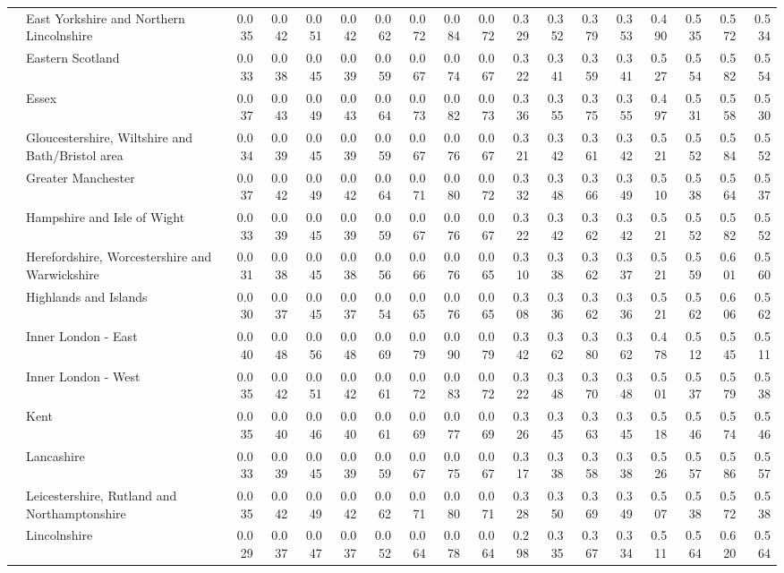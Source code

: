 \begin{tabular}{llrrrrrrrrrrrrrrrr}
 & East Yorkshire and Northern Lincolnshire & 0.035 & 0.042 & 0.051 & 0.042 & 0.062 & 0.072 & 0.084 & 0.072 & 0.329 & 0.352 & 0.379 & 0.353 & 0.490 & 0.535 & 0.572 & 0.534 \\
 & Eastern Scotland & 0.033 & 0.038 & 0.045 & 0.039 & 0.059 & 0.067 & 0.074 & 0.067 & 0.322 & 0.341 & 0.359 & 0.341 & 0.527 & 0.554 & 0.582 & 0.554 \\
 & Essex & 0.037 & 0.043 & 0.049 & 0.043 & 0.064 & 0.073 & 0.082 & 0.073 & 0.336 & 0.355 & 0.375 & 0.355 & 0.497 & 0.531 & 0.558 & 0.530 \\
 & Gloucestershire, Wiltshire and Bath/Bristol area & 0.034 & 0.039 & 0.045 & 0.039 & 0.059 & 0.067 & 0.076 & 0.067 & 0.321 & 0.342 & 0.361 & 0.342 & 0.521 & 0.552 & 0.584 & 0.552 \\
 & Greater Manchester & 0.037 & 0.042 & 0.049 & 0.042 & 0.064 & 0.071 & 0.080 & 0.072 & 0.332 & 0.348 & 0.366 & 0.349 & 0.510 & 0.538 & 0.564 & 0.537 \\
 & Hampshire and Isle of Wight & 0.033 & 0.039 & 0.045 & 0.039 & 0.059 & 0.067 & 0.076 & 0.067 & 0.322 & 0.342 & 0.362 & 0.342 & 0.521 & 0.552 & 0.582 & 0.552 \\
 & Herefordshire, Worcestershire and Warwickshire & 0.031 & 0.038 & 0.045 & 0.038 & 0.056 & 0.066 & 0.076 & 0.065 & 0.310 & 0.338 & 0.362 & 0.337 & 0.521 & 0.559 & 0.601 & 0.560 \\
 & Highlands and Islands & 0.030 & 0.037 & 0.045 & 0.037 & 0.054 & 0.065 & 0.076 & 0.065 & 0.308 & 0.336 & 0.362 & 0.336 & 0.521 & 0.562 & 0.606 & 0.562 \\
 & Inner London - East & 0.040 & 0.048 & 0.056 & 0.048 & 0.069 & 0.079 & 0.090 & 0.079 & 0.342 & 0.362 & 0.380 & 0.362 & 0.478 & 0.512 & 0.545 & 0.511 \\
 & Inner London - West & 0.035 & 0.042 & 0.051 & 0.042 & 0.061 & 0.072 & 0.083 & 0.072 & 0.322 & 0.348 & 0.370 & 0.348 & 0.501 & 0.537 & 0.579 & 0.538 \\
 & Kent & 0.035 & 0.040 & 0.046 & 0.040 & 0.061 & 0.069 & 0.077 & 0.069 & 0.326 & 0.345 & 0.363 & 0.345 & 0.518 & 0.546 & 0.574 & 0.546 \\
 & Lancashire & 0.033 & 0.039 & 0.045 & 0.039 & 0.059 & 0.067 & 0.075 & 0.067 & 0.317 & 0.338 & 0.358 & 0.338 & 0.526 & 0.557 & 0.586 & 0.557 \\
 & Leicestershire, Rutland and Northamptonshire & 0.035 & 0.042 & 0.049 & 0.042 & 0.062 & 0.071 & 0.080 & 0.071 & 0.328 & 0.350 & 0.369 & 0.349 & 0.507 & 0.538 & 0.572 & 0.538 \\
 & Lincolnshire & 0.029 & 0.037 & 0.047 & 0.037 & 0.052 & 0.064 & 0.078 & 0.064 & 0.298 & 0.335 & 0.367 & 0.334 & 0.511 & 0.564 & 0.620 & 0.564 \\

\end{tabular}
